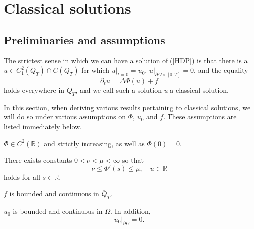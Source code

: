 \documentclass[11pt, a4paper]{article}
\begin{document}
\section{Classical solutions}
\subsection{Preliminaries and assumptions}
The strictest sense in which we can have a solution of (\ref{HDP}) is that there is a $u \in C^2_1(Q_T)\cap C(\overline{Q}_T)$ for which $u\big|_{t=0} = u_0$,  $u\big|_{\partial\Omega \times [0,T]} = 0$, and the equality
\begin{equation*}
\partial_t u = \Delta \Phi(u) + f
\end{equation*}
holds everywhere in $Q_T$, and we call such a solution $u$ a classical solution.

In this section, when deriving various results pertaining to classical solutions, we will do so under various assumptions on $\Phi$, $u_0$ and $f$. These assumptions are listed immediately below.

\begin{assumption}
\label{ass:classical_Phi_smooth}
$\Phi \in C^2(\mathbb{R})$ and strictly increasing, as well as $\Phi(0) = 0$.
\end{assumption}

\begin{assumption}
\label{ass:classical_uniform_parabolicity}
There exists constants $ 0 < \nu < \mu < \infty$ so that
\begin{equation}
\label{uniform_parabGPME}
\nu \leq \Phi'(s) \leq \mu, \quad u \in \mathbb{R}
\end{equation}
holds for all $s \in \mathbb{R}$.
\end{assumption}

\begin{assumption}[Continuity of $f$]
\label{ass:classical_f}
$f$ is bounded and continuous in $\overline{Q}_T$.
\end{assumption}

\begin{assumption}[Continuity of $u_0$]
\label{ass:classical_u_0}
$u_0$ is bounded and continuous in $\overline{\Omega}$. In addition, 
\begin{equation}
u_0\big|_{\partial \Omega} = 0.
\end{equation}
\end{assumption}
\end{document}

